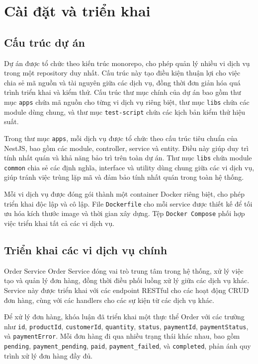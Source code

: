\section{Cài đặt và triển khai}

\subsection{Cấu trúc dự án}
Dự án được tổ chức theo kiến trúc monorepo, cho phép quản lý nhiều vi dịch vụ trong một repository duy nhất. Cấu trúc này tạo điều kiện thuận lợi cho việc chia sẻ mã nguồn và tài nguyên giữa các dịch vụ, đồng thời đơn giản hóa quá trình triển khai và kiểm thử. Cấu trúc thư mục chính của dự án bao gồm thư mục \texttt{apps} chứa mã nguồn cho từng vi dịch vụ riêng biệt, thư mục \texttt{libs} chứa các module dùng chung, và thư mục \texttt{test-script} chứa các kịch bản kiểm thử hiệu suất.

Trong thư mục \texttt{apps}, mỗi dịch vụ được tổ chức theo cấu trúc tiêu chuẩn của NestJS, bao gồm các module, controller, service và entity. Điều này giúp duy trì tính nhất quán và khả năng bảo trì trên toàn dự án. Thư mục \texttt{libs} chứa module \texttt{common} chia sẻ các định nghĩa, interface và utility dùng chung giữa các vi dịch vụ, giúp tránh việc trùng lặp mã và đảm bảo tính nhất quán trong toàn hệ thống.

Mỗi vi dịch vụ được đóng gói thành một container Docker riêng biệt, cho phép triển khai độc lập và cô lập. File \texttt{Dockerfile} cho mỗi service được thiết kế để tối ưu hóa kích thước image và thời gian xây dựng. Tệp \texttt{Docker Compose} phối hợp việc triển khai tất cả các vi dịch vụ.

\subsection{Triển khai các vi dịch vụ chính}

Order Service
Order Service đóng vai trò trung tâm trong hệ thống, xử lý việc tạo và quản lý đơn hàng, đồng thời điều phối luồng xử lý giữa các dịch vụ khác. Service này được triển khai với các endpoint RESTful cho các hoạt động CRUD đơn hàng, cùng với các handlers cho các sự kiện từ các dịch vụ khác.

Để xử lý đơn hàng, khóa luận đã triển khai một thực thể Order với các trường như \texttt{id}, \texttt{productId}, \texttt{customerId}, \texttt{quantity}, \texttt{status}, \texttt{paymentId}, \texttt{paymentStatus}, và \texttt{paymentError}. Mỗi đơn hàng đi qua nhiều trạng thái khác nhau, bao gồm \texttt{pending}, \texttt{payment\_pending}, \texttt{paid}, \texttt{payment\_failed}, và \texttt{completed}, phản ánh quy trình xử lý đơn hàng đầy đủ.

